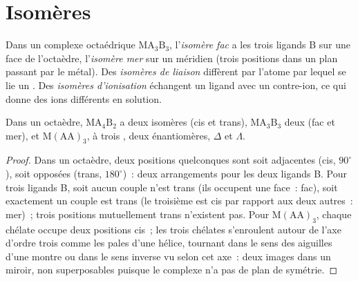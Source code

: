 \section{Isomères}

\begin{definition}\label{def:b2:coordination-complexes:isomers}
Dans un complexe octaédrique $\mathrm{MA_3B_3}$, l'\emph{isomère fac} a
les trois ligands B sur une face de l'octaèdre, l'\emph{isomère
mer} sur un méridien (trois positions dans un plan passant par le
métal). Des \emph{isomères de liaison} diffèrent par l'atome par lequel
se lie un . Des \emph{isomères d'ionisation}
échangent un ligand avec un contre-ion, ce qui donne des ions différents en solution.
\end{definition}

\begin{proposition}\label{prop:b2:coordination-complexes:isomer-count}
Dans un octaèdre, $\mathrm{MA_4B_2}$ a deux isomères (cis et trans), $\mathrm{MA_3B_3}$ deux
(fac et mer), et $\mathrm M(\mathrm{AA})_3$, à trois , deux
énantiomères, $\Delta$ et $\Lambda$.
\end{proposition}

\begin{proof}
Dans un octaèdre, deux positions quelconques sont soit adjacentes (cis, $90^\circ$), soit opposées
(trans, $180^\circ$)~: deux arrangements pour les deux ligands B. Pour trois ligands B,
soit aucun couple n'est trans (ils occupent une face~: fac), soit exactement un couple est trans (le
troisième est cis par rapport aux deux autres~: mer)~; trois positions mutuellement trans n'existent pas. Pour
$\mathrm M(\mathrm{AA})_3$, chaque chélate occupe deux positions cis~; les trois chélates
s'enroulent autour de l'axe d'ordre trois comme les pales d'une hélice, tournant dans le sens des aiguilles d'une montre
ou dans le sens inverse vu selon cet axe~: deux images dans un miroir, non superposables
puisque le complexe n'a pas de plan de symétrie.
\end{proof}

